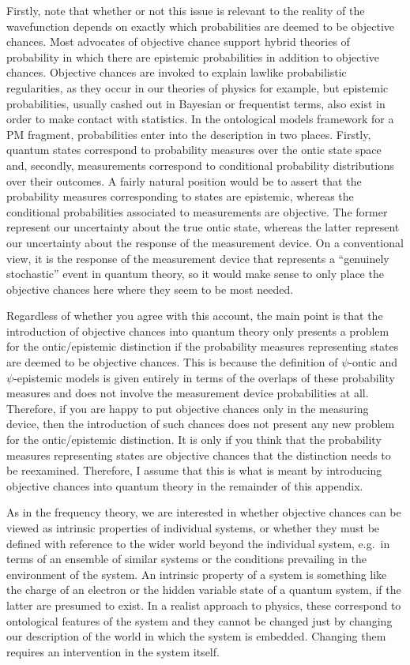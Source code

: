 \documentclass[DIV=calc,fontsize=12pt]{scrartcl} %
\theoremstyle{definition}
\theoremstyle{plain}
\begin{document}
Firstly, note that whether or not this issue is relevant to the
reality of the wavefunction depends on exactly which probabilities are
deemed to be objective chances.  Most advocates of objective chance
support hybrid theories of probability in which there are epistemic
probabilities in addition to objective chances.  Objective chances are
invoked to explain lawlike probabilistic regularities, as they occur
in our theories of physics for example, but epistemic probabilities,
usually cashed out in Bayesian or frequentist terms, also exist in
order to make contact with statistics.  In the ontological models
framework for a PM fragment, probabilities enter into the description
in two places.  Firstly, quantum states correspond to probability
measures over the ontic state space and, secondly, measurements
correspond to conditional probability distributions over their
outcomes.  A fairly natural position would be to assert that the
probability measures corresponding to states are epistemic, whereas
the conditional probabilities associated to measurements are
objective.  The former represent our uncertainty about the true ontic
state, whereas the latter represent our uncertainty about the response
of the measurement device.  On a conventional view, it is the response
of the measurement device that represents a ``genuinely stochastic''
event in quantum theory, so it would make sense to only place the
objective chances here where they seem to be most needed.

Regardless of whether you agree with this account, the main point is
that the introduction of objective chances into quantum theory only
presents a problem for the ontic/epistemic distinction if the
probability measures representing states are deemed to be objective
chances.  This is because the definition of $\psi$-ontic and
$\psi$-epistemic models is given entirely in terms of the overlaps of
these probability measures and does not involve the measurement device
probabilities at all.  Therefore, if you are happy to put objective
chances only in the measuring device, then the introduction of such
chances does not present any new problem for the ontic/epistemic
distinction.  It is only if you think that the probability measures
representing states are objective chances that the distinction needs
to be reexamined.  Therefore, I assume that this is what is meant by
introducing objective chances into quantum theory in the remainder of
this appendix.

As in the frequency theory, we are interested in whether objective
chances can be viewed as intrinsic properties of individual systems,
or whether they must be defined with reference to the wider world
beyond the individual system, e.g.\ in terms of an ensemble of similar
systems or the conditions prevailing in the environment of the system.
An intrinsic property of a system is something like the charge of an
electron or the hidden variable state of a quantum system, if the
latter are presumed to exist.  In a realist approach to physics, these
correspond to ontological features of the system and they cannot be
changed just by changing our description of the world in which the
system is embedded.  Changing them requires an intervention in the
system itself.
\end{document}

